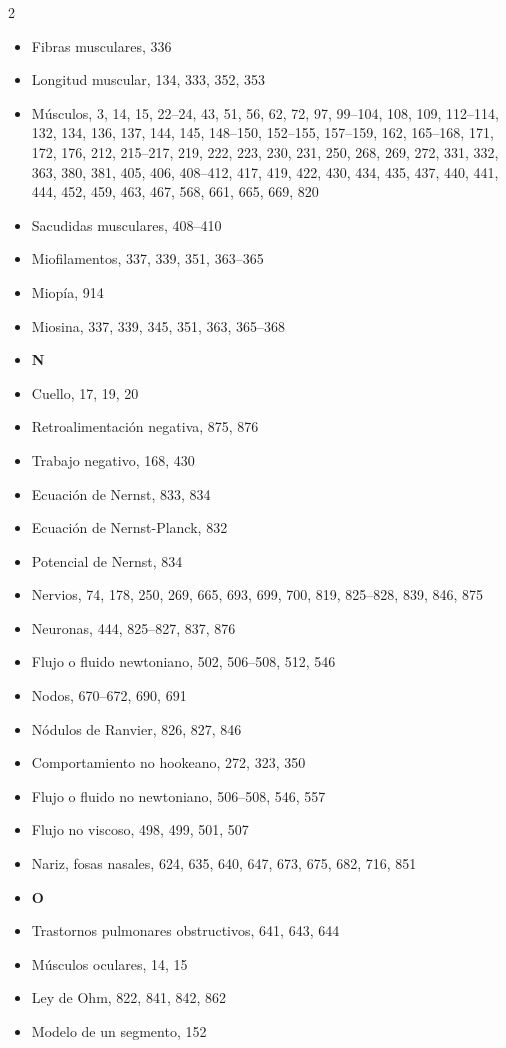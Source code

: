 \documentclass[12pt,a4paper]{book}
\begin{document}
\begin{multicols}{2}
\begin{itemize}[leftmargin=*]
  \item Fibras musculares, 336
  \item Longitud muscular, 134, 333, 352, 353
  \item Músculos, 3, 14, 15, 22--24, 43, 51, 56, 62, 72, 97, 99--104, 108, 109, 112--114, 132, 134, 136, 137, 144, 145, 148--150, 152--155, 157--159, 162, 165--168, 171, 172, 176, 212, 215--217, 219, 222, 223, 230, 231, 250, 268, 269, 272, 331, 332, 363, 380, 381, 405, 406, 408--412, 417, 419, 422, 430, 434, 435, 437, 440, 441, 444, 452, 459, 463, 467, 568, 661, 665, 669, 820
  \item Sacudidas musculares, 408--410
  \item Miofilamentos, 337, 339, 351, 363--365
  \item Miopía, 914
  \item Miosina, 337, 339, 345, 351, 363, 365--368
  \item \textbf{N}
  \item Cuello, 17, 19, 20
  \item Retroalimentación negativa, 875, 876
  \item Trabajo negativo, 168, 430
  \item Ecuación de Nernst, 833, 834
  \item Ecuación de Nernst-Planck, 832
  \item Potencial de Nernst, 834
  \item Nervios, 74, 178, 250, 269, 665, 693, 699, 700, 819, 825--828, 839, 846, 875
  \item Neuronas, 444, 825--827, 837, 876
  \item Flujo o fluido newtoniano, 502, 506--508, 512, 546
  \item Nodos, 670--672, 690, 691
  \item Nódulos de Ranvier, 826, 827, 846
  \item Comportamiento no hookeano, 272, 323, 350
  \item Flujo o fluido no newtoniano, 506--508, 546, 557
  \item Flujo no viscoso, 498, 499, 501, 507
  \item Nariz, fosas nasales, 624, 635, 640, 647, 673, 675, 682, 716, 851
  \item \textbf{O}
  \item Trastornos pulmonares obstructivos, 641, 643, 644
  \item Músculos oculares, 14, 15
  \item Ley de Ohm, 822, 841, 842, 862
  \item Modelo de un segmento, 152

\end{itemize}
\end{multicols}
\end{document}
